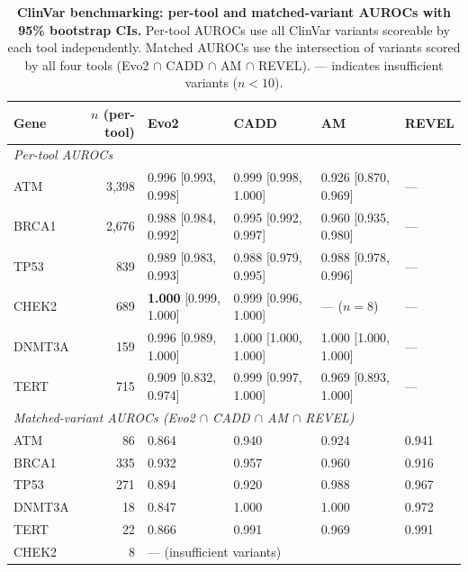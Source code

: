 \documentclass[11pt]{article}
\begin{document}
\begin{table}[h]
  \centering
  \caption{\textbf{ClinVar benchmarking: per-tool and matched-variant AUROCs with 95\% bootstrap CIs.}
    Per-tool AUROCs use all ClinVar variants scoreable by each tool independently.
    Matched AUROCs use the intersection of variants scored by all four tools
    (Evo2 $\cap$ CADD $\cap$ AM $\cap$ REVEL). --- indicates insufficient
    variants ($n < 10$).}
  \label{tab:clinvar_aurocs}
  \small
  \begin{tabular}{lrllll}
    \toprule
    Gene & $n$ (per-tool) & Evo2 & CADD & AM & REVEL \\
    \midrule
    \multicolumn{6}{l}{\textit{Per-tool AUROCs}} \\
    ATM    & 3,398 & 0.996 [0.993, 0.998] & 0.999 [0.998, 1.000] & 0.926 [0.870, 0.969] & --- \\
    BRCA1  & 2,676 & 0.988 [0.984, 0.992] & 0.995 [0.992, 0.997] & 0.960 [0.935, 0.980] & --- \\
    TP53   & 839   & 0.989 [0.983, 0.993] & 0.988 [0.979, 0.995] & 0.988 [0.978, 0.996] & --- \\
    CHEK2  & 689   & \textbf{1.000} [0.999, 1.000] & 0.999 [0.996, 1.000] & --- ($n=8$)  & --- \\
    DNMT3A & 159   & 0.996 [0.989, 1.000] & 1.000 [1.000, 1.000] & 1.000 [1.000, 1.000] & --- \\
    TERT   & 715   & 0.909 [0.832, 0.974] & 0.999 [0.997, 1.000] & 0.969 [0.893, 1.000] & --- \\
    \midrule
    \multicolumn{6}{l}{\textit{Matched-variant AUROCs (Evo2 $\cap$ CADD $\cap$ AM $\cap$ REVEL)}} \\
    ATM    & 86  & 0.864 & 0.940 & 0.924 & 0.941 \\
    BRCA1  & 335 & 0.932 & 0.957 & 0.960 & 0.916 \\
    TP53   & 271 & 0.894 & 0.920 & 0.988 & 0.967 \\
    DNMT3A & 18  & 0.847 & 1.000 & 1.000 & 0.972 \\
    TERT   & 22  & 0.866 & 0.991 & 0.969 & 0.991 \\
    CHEK2  & 8   & \multicolumn{4}{l}{--- (insufficient variants)} \\
    \bottomrule
  \end{tabular}
\end{table}
\end{document}
